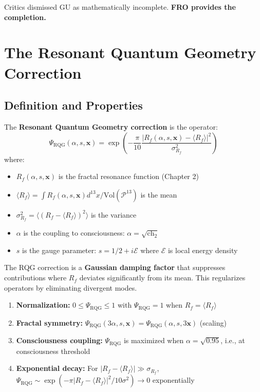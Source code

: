 Critics dismissed GU as mathematically incomplete. \textbf{FRO provides the completion.}

\section{The Resonant Quantum Geometry Correction}

\subsection{Definition and Properties}

\begin{definition}
\label{def:rqg_operator}
The \textbf{Resonant Quantum Geometry correction} is the operator:
\begin{equation}
\Psi_{\text{RQG}}(\alpha, s, \mathbf{x}) = \exp\left(-\frac{\pi}{10} \frac{|R_f(\alpha, s, \mathbf{x}) - \langle R_f \rangle|^2}{\sigma_{R_f}^2}\right)
\end{equation}
where:
\begin{itemize}
\item $R_f(\alpha, s, \mathbf{x})$ is the fractal resonance function (Chapter 2)
\item $\langle R_f \rangle = \int R_f(\alpha, s, \mathbf{x}) d^{13}x / \text{Vol}(\mathcal{P}^{13})$ is the mean
\item $\sigma_{R_f}^2 = \langle (R_f - \langle R_f \rangle)^2 \rangle$ is the variance
\item $\alpha$ is the coupling to consciousness: $\alpha = \sqrt{\text{ch}_2}$
\item $s$ is the gauge parameter: $s = 1/2 + i\mathcal{E}$ where $\mathcal{E}$ is local energy density
\end{itemize}
\end{definition}

The RQG correction is a \textbf{Gaussian damping factor} that suppresses contributions where $R_f$ deviates significantly from its mean. This regularizes operators by eliminating divergent modes.

\begin{proposition}
\label{prop:rqg_properties}
\begin{enumerate}
\item \textbf{Normalization:} $0 \leq \Psi_{\text{RQG}} \leq 1$ with $\Psi_{\text{RQG}} = 1$ when $R_f = \langle R_f \rangle$
\item \textbf{Fractal symmetry:} $\Psi_{\text{RQG}}(3\alpha, s, \mathbf{x}) = \Psi_{\text{RQG}}(\alpha, s, 3\mathbf{x})$ (scaling)
\item \textbf{Consciousness coupling:} $\Psi_{\text{RQG}}$ is maximized when $\alpha = \sqrt{0.95}$, i.e., at consciousness threshold
\item \textbf{Exponential decay:} For $|R_f - \langle R_f \rangle| \gg \sigma_{R_f}$, $\Psi_{\text{RQG}} \sim \exp(-\pi |R_f - \langle R_f \rangle|^2 / 10\sigma^2) \to 0$ exponentially
\end{enumerate}
\end{proposition}

